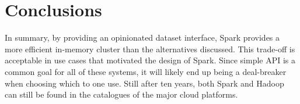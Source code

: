 \chapter{Conclusions\label{conclusions}}

In summary, by providing an opinionated dataset interface, Spark provides a more efficient in-memory cluster than the
alternatives discussed. This trade-off is acceptable in use cases that motivated the design of Spark. Since simple API
is a common goal for all of these systems, it will likely end up being a deal-breaker when choosing which to one use.
Still after ten years, both Spark and Hadoop can still be found in the catalogues of the major cloud platforms.
